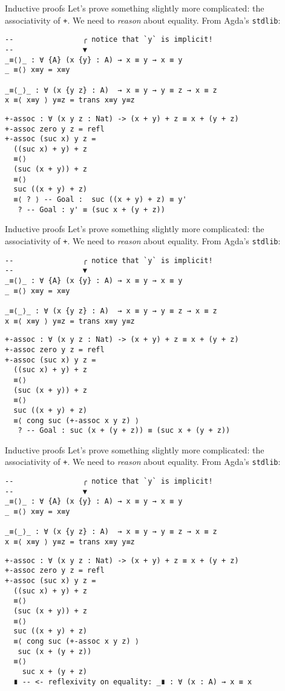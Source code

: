 \documentclass[t,aspectratio=169,9pt]{beamer}
\begin{document}
\begin{frame}[fragile]{Inductive proofs}
  Let's prove something slightly more complicated: the associativity of
  \texttt{+}. We need to {\it reason} about equality. From Agda's
  \texttt{stdlib}:
\begin{verbatim}
--                ╭ notice that `y` is implicit!
--                ▼
_≡⟨⟩_ : ∀ {A} (x {y} : A) → x ≡ y → x ≡ y
_ ≡⟨⟩ x≡y = x≡y

_≡⟨_⟩_ : ∀ (x {y z} : A)  → x ≡ y → y ≡ z → x ≡ z
x ≡⟨ x≡y ⟩ y≡z = trans x≡y y≡z
\end{verbatim}
\begin{verbatim}
+-assoc : ∀ (x y z : Nat) -> (x + y) + z ≡ x + (y + z)
+-assoc zero y z = refl
+-assoc (suc x) y z =
  ((suc x) + y) + z
  ≡⟨⟩
  (suc (x + y)) + z
  ≡⟨⟩
  suc ((x + y) + z)
  ≡⟨ ? ⟩ -- Goal :  suc ((x + y) + z) ≡ y'
   ? -- Goal : y' ≡ (suc x + (y + z))
\end{verbatim}
\end{frame}
\begin{frame}[fragile]{Inductive proofs}
  Let's prove something slightly more complicated: the associativity of
  \texttt{+}. We need to {\it reason} about equality. From Agda's
  \texttt{stdlib}:
\begin{verbatim}
--                ╭ notice that `y` is implicit!
--                ▼
_≡⟨⟩_ : ∀ {A} (x {y} : A) → x ≡ y → x ≡ y
_ ≡⟨⟩ x≡y = x≡y

_≡⟨_⟩_ : ∀ (x {y z} : A)  → x ≡ y → y ≡ z → x ≡ z
x ≡⟨ x≡y ⟩ y≡z = trans x≡y y≡z
\end{verbatim}
\begin{verbatim}
+-assoc : ∀ (x y z : Nat) -> (x + y) + z ≡ x + (y + z)
+-assoc zero y z = refl
+-assoc (suc x) y z =
  ((suc x) + y) + z
  ≡⟨⟩
  (suc (x + y)) + z
  ≡⟨⟩
  suc ((x + y) + z)
  ≡⟨ cong suc (+-assoc x y z) ⟩
   ? -- Goal : suc (x + (y + z)) ≡ (suc x + (y + z))
\end{verbatim}
\end{frame}
\begin{frame}[fragile]{Inductive proofs}
  Let's prove something slightly more complicated: the associativity of
  \texttt{+}. We need to {\it reason} about equality. From Agda's
  \texttt{stdlib}:
\begin{verbatim}
--                ╭ notice that `y` is implicit!
--                ▼
_≡⟨⟩_ : ∀ {A} (x {y} : A) → x ≡ y → x ≡ y
_ ≡⟨⟩ x≡y = x≡y

_≡⟨_⟩_ : ∀ (x {y z} : A)  → x ≡ y → y ≡ z → x ≡ z
x ≡⟨ x≡y ⟩ y≡z = trans x≡y y≡z
\end{verbatim}
\begin{verbatim}
+-assoc : ∀ (x y z : Nat) -> (x + y) + z ≡ x + (y + z)
+-assoc zero y z = refl
+-assoc (suc x) y z =
  ((suc x) + y) + z
  ≡⟨⟩
  (suc (x + y)) + z
  ≡⟨⟩
  suc ((x + y) + z)
  ≡⟨ cong suc (+-assoc x y z) ⟩
   suc (x + (y + z))
  ≡⟨⟩
    suc x + (y + z)
  ∎ -- <- reflexivity on equality: _∎ : ∀ (x : A) → x ≡ x
\end{verbatim}
\end{frame}
\end{document}
